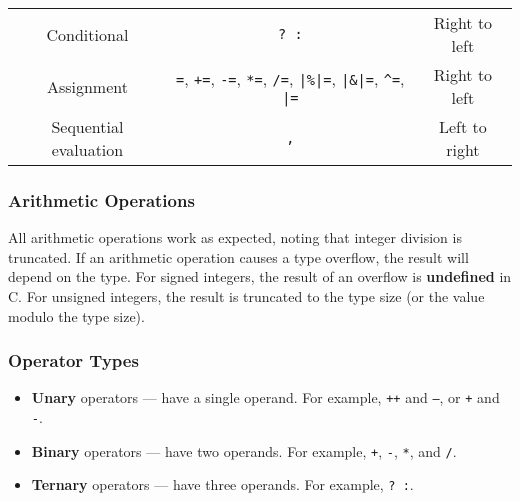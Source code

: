 \documentclass{article}
\begin{document}
\begin{table}[H]
\begin{tabular}{c c c}
        Conditional                   & \texttt{? :}                                                                                                                                                                                                       & Right to left                  \\
        Assignment                    & \texttt{=}, \texttt{+=}, \texttt{-=}, \texttt{*=}, \texttt{/=}, \texttt{|\%|=}, \texttt{|\&|=}, \texttt{^=}, \texttt{|=} & Right to left                  \\
        Sequential evaluation         & \texttt{,}                                                                                                                                                                                                         & Left to right                  \\
        \bottomrule
    \end{tabular}
\end{table}
\subsubsection{Arithmetic Operations}
All arithmetic operations work as expected, noting that integer
division is truncated. If an arithmetic operation causes a type
overflow, the result will depend on the type. For signed integers, the
result of an overflow is \textbf{undefined} in C. For unsigned
integers, the result is truncated to the type size (or the value modulo
the type size).
\subsubsection{Operator Types}
\begin{itemize}
    \item \textbf{Unary} operators --- have a single operand. For example, \texttt{++} and \texttt{--}, or \texttt{+} and \texttt{-}.
    \item \textbf{Binary} operators --- have two operands. For example, \texttt{+}, \texttt{-}, \texttt{*}, and \texttt{/}.
    \item \textbf{Ternary} operators --- have three operands. For example, \texttt{? :}.
\end{itemize}
\end{document}
